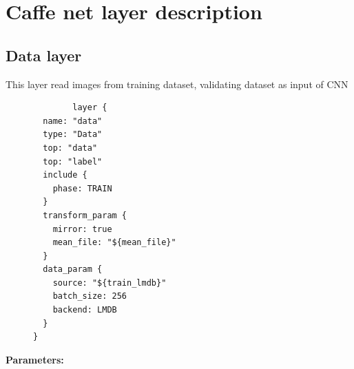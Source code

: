 \documentclass[11pt]{article}
\begin{document}
\section{Caffe net layer description}
\subsection{Data layer}
This layer read images from training dataset, validating dataset as input of CNN
\begin{figure}
  \begin{center}
	\begin{verbatim}
		layer {
  name: "data"
  type: "Data"
  top: "data"
  top: "label"
  include {
    phase: TRAIN
  }
  transform_param {
    mirror: true
    mean_file: "${mean_file}"
  }
  data_param {
    source: "${train_lmdb}"
    batch_size: 256
    backend: LMDB
  }
}
	\end{verbatim}
  \end{center}
\end{figure}
\textbf{Parameters:} 
\end{document}
